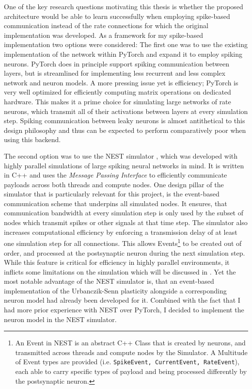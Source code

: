 One of the key research questions motivating this thesis is whether the proposed architecture would be able to learn
successfully when employing spike-based communication instead of the rate connections for which the original
implementation was developed. As a framework for my spike-based implementation two options were considered: The first
one was to use the existing implementation of the network within PyTorch  and expand it to
employ spiking neurons. PyTorch does in principle support spiking communication between layers, but is streamlined for
implementing less recurrent and less complex network and neuron models. A more pressing issue yet is efficiency; PyTorch
is very well optimized for efficiently computing matrix operations on dedicated hardware. This makes it a prime choice
for simulating large networks of rate neurons, which transmit all of their activations between layers at every
simulation step. Spiking communication between leaky neurons is almost antithetical to this design philosophy and thus
can be expected to perform comparatively poor when using this backend.

The second option was to use the NEST simulator \citeme, which was developed with highly parallel simulations of large
spiking neural networks in mind. It is written in C++ and uses the \textit{Message Passing Interface} to efficiently
communicate payloads across both threads and compute nodes. One design pillar of the simulator that is particularly
relevant for this project, is the event-based communication scheme that underpins all simulated nodes. It ensures, that
communication bandwidth at every simulation step is only used by the subset of nodes which transmit spikes or other
signals at that time step. The simulator also increases computational efficiency by enforcing a transmission delay of at
least one simulation step for all connections. This allows Events\footnote{An Event in NEST is an abstract C++ Class
  that is created by neurons, and transmitted across threads and compute nodes by the Simulator. A Multitude of Event
  types are provided (i.e. \texttt{SpikeEvent, CurrentEvent, RateEvent}), each able to carry specific types of payload and
  being processed differently by the postsynaptic neuron.} to be created out of order, and processed at the postsynaptic
neuron during the next simulation step. While this feature is critical for efficiency in highly parallel environments,
it inflicts some limitations on the simulation which will be discussed in . Yet the most notable
advantage of the NEST simulator is, that an event-based implementation of the Urbanczik-Senn plasticity alongside a
corresponding neuron model had already been developed for it. Combined with the fact that I had more prior experience
with NEST over PyTorch, I decided to implement the neuron model in the NEST simulator.

